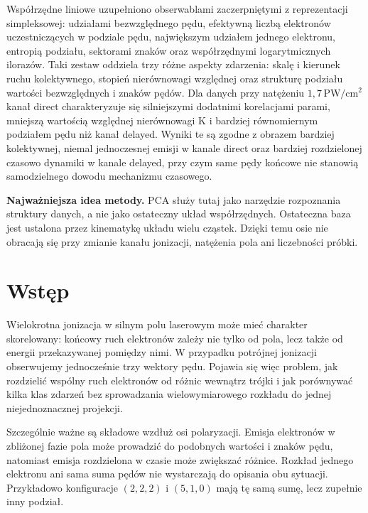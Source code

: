 \documentclass[12pt,letterpaper,oneside]{report}
\numberwithin{equation}{chapter}
\numberwithin{figure}{chapter}
\numberwithin{table}{chapter}
\newenvironment{importantbox}[1]
  {\par\medskip\noindent\textbf{#1.}\quad}
  {\par\medskip}
\begin{document}
Współrzędne liniowe uzupełniono obserwablami zaczerpniętymi z
reprezentacji simpleksowej: udziałami bezwzględnego pędu, efektywną
liczbą elektronów uczestniczących w podziale pędu, największym udziałem
jednego elektronu, entropią podziału, sektorami znaków oraz
współrzędnymi logarytmicznych ilorazów. Taki zestaw oddziela trzy różne
aspekty zdarzenia: skalę i kierunek ruchu kolektywnego, stopień
nierównowagi względnej oraz strukturę podziału wartości bezwzględnych i
znaków pędów. Dla danych przy natężeniu \ensuremath{1{,}7\,\mathrm{PW/cm^2}} kanał direct
charakteryzuje się silniejszymi dodatnimi korelacjami parami, mniejszą
wartością względnej nierównowagi K i bardziej równomiernym podziałem
pędu niż kanał delayed. Wyniki te są zgodne z obrazem bardziej
kolektywnej, niemal jednoczesnej emisji w kanale direct oraz bardziej
rozdzielonej czasowo dynamiki w kanale delayed, przy czym same pędy
końcowe nie stanowią samodzielnego dowodu mechanizmu czasowego.

\begin{importantbox}{Najważniejsza idea metody}
PCA służy tutaj jako narzędzie rozpoznania struktury danych, a nie jako
ostateczny układ współrzędnych. Ostateczna baza jest ustalona przez
kinematykę układu wielu cząstek. Dzięki temu osie nie obracają się przy
zmianie kanału jonizacji, natężenia pola ani liczebności próbki.
\end{importantbox}


\clearpage
\thispagestyle{empty}
\null
\clearpage
\chapter{Wstęp}

Wielokrotna jonizacja w silnym polu laserowym może mieć charakter skorelowany: końcowy ruch elektronów zależy nie tylko od pola, lecz także od energii przekazywanej pomiędzy nimi. W przypadku potrójnej jonizacji obserwujemy jednocześnie trzy wektory pędu. Pojawia się więc problem, jak rozdzielić wspólny ruch elektronów od różnic wewnątrz trójki i jak porównywać kilka klas zdarzeń bez sprowadzania wielowymiarowego rozkładu do jednej niejednoznacznej projekcji.

Szczególnie ważne są składowe wzdłuż osi polaryzacji. Emisja elektronów w zbliżonej fazie pola może prowadzić do podobnych wartości i znaków pędu, natomiast emisja rozdzielona w czasie może zwiększać różnice. Rozkład jednego elektronu ani sama suma pędów nie wystarczają do opisania obu sytuacji. Przykładowo konfiguracje $(2,2,2)$ i $(5,1,0)$ mają tę samą sumę, lecz zupełnie inny podział.
\end{document}
